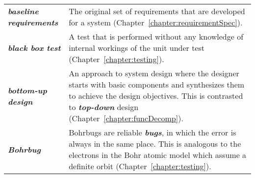 \begin{longtable} { p{3cm} p{11cm}}
\emph{\textbf{baseline requirements}} & The original set of requirements
that are developed for a system (Chapter~\ref{chapter:requirementSpec}). \B \\

\emph{\textbf{black box test}} & A test that is performed without any
knowledge of internal workings of the unit under test (Chapter~\ref{chapter:testing}). \B \\

\emph{\textbf{bottom-up design}} & An approach to system design where
the designer starts with basic components and synthesizes them to
achieve the design objectives. This is contrasted to
\emph{\textbf{top-down}} design (Chapter~\ref{chapter:funcDecomp}). \B \\

\emph{\textbf{Bohrbug}} & Bohrbugs are reliable \emph{\textbf{bugs}}, in
which the error is always in the same place. This is analogous to the
electrons in the Bohr atomic model which assume a definite orbit
(Chapter~\ref{chapter:testing}). \B \\


\end{longtable}
